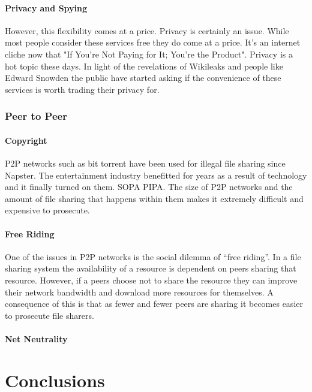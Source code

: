 \documentclass[11pt]{amsart}
\begin{document}
\subsection{Privacy and Spying}
However, this flexibility comes at a price. Privacy is certainly an issue. While most people consider these services free they do come at a price. It's an internet cliche now that "If You're Not Paying for It; You're the Product". Privacy is a hot topic these days. In light of the revelations of Wikileaks and people like Edward Snowden the public have started asking if the convenience of these services is worth trading their privacy for. 
\section{Peer to Peer}

\subsection{Copyright}

P2P networks such as bit torrent have been used for illegal file sharing since Napster. The entertainment industry benefitted for years as a result of technology and it finally turned on them. SOPA PIPA. The size of P2P networks and the amount of file sharing that happens within them makes it extremely difficult and expensive to prosecute.

\subsection{Free Riding}\cite{FreeRiding}

One of the issues in P2P networks is the social dilemma of ``free riding''. In a file sharing system the availability of a resource is dependent on peers sharing that resource. However, if a peers choose not to share the resource they can improve their network bandwidth and download more resources for themselves. A consequence of this is that as fewer and fewer peers are sharing it becomes easier to prosecute file sharers. 

\subsection{Net Neutrality}

\part{Conclusions}






\end{document}
